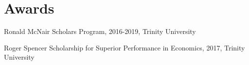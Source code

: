 
\section{Awards} %
\label{sec:award}
\vspace{-0.25in}
\begin{outerlist}
	\item 	 Ronald McNair Scholars Program, 2016-2019, Trinity  University
	\item    Roger Spencer Scholarship for Superior Performance in Economics, 2017, Trinity University 
\end{outerlist}